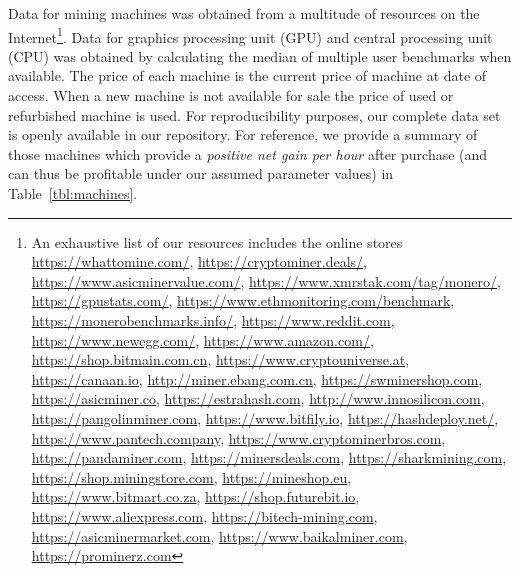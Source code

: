 Data for mining machines was obtained from a multitude of resources on the
Internet\footnote{An exhaustive list of our resources includes the online
stores \url{https://whattomine.com/}, \url{https://cryptominer.deals/},
\url{https://www.asicminervalue.com/},
\url{https://www.xmrstak.com/tag/monero/}, \url{https://gpustats.com/},
\url{https://www.ethmonitoring.com/benchmark},
\url{https://monerobenchmarks.info/}, \url{https://www.reddit.com},
\url{https://www.newegg.com/}, \url{https://www.amazon.com/},
\url{https://shop.bitmain.com.cn}, \url{https://www.cryptouniverse.at},
\url{https://canaan.io}, \url{http://miner.ebang.com.cn},
\url{https://swminershop.com}, \url{https://asicminer.co},
\url{https://estrahash.com}, \url{http://www.innosilicon.com},
\url{https://pangolinminer.com}, \url{https://www.bitfily.io},
\url{https://hashdeploy.net/}, \url{https://www.pantech.company},
\url{https://www.cryptominerbros.com}, \url{https://pandaminer.com},
\url{https://minersdeals.com}, \url{https://sharkmining.com},
\url{https://shop.miningstore.com}, \url{https://mineshop.eu},
\url{https://www.bitmart.co.za}, \url{https://shop.futurebit.io},
\url{https://www.aliexpress.com}, \url{https://bitech-mining.com},
\url{https://asicminermarket.com}, \url{https://www.baikalminer.com},
\url{https://prominerz.com}}. Data for graphics processing unit (GPU) and
central processing unit (CPU) was obtained by calculating the median of
multiple user benchmarks when available. The price of each machine is the
current price of machine at date of access. When a new machine is not available
for sale the price of used or refurbished machine is used. For reproducibility
purposes, our complete data set is openly available in our repository. For
reference, we provide a summary of those machines which provide a
\emph{positive net gain per hour} after purchase (and can thus be profitable
under our assumed parameter values) in Table~\ref{tbl:machines}.

